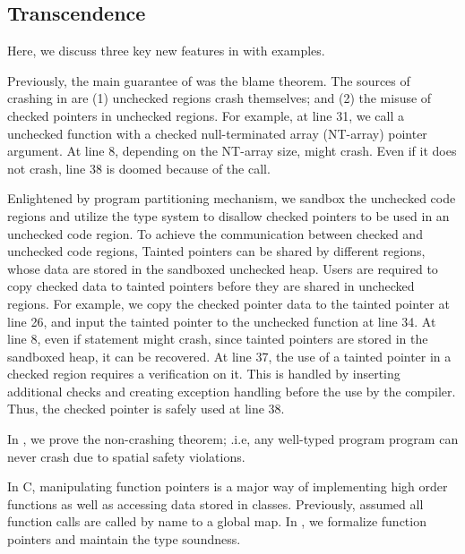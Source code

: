 \subsection{\systemname Transcendence}

Here, we discuss three key new features in \systemname with examples.

Previously, the main guarantee of \checkedc \cite{li22checkedc} was the blame theorem.
The sources of crashing in \checkedc are (1) unchecked regions crash themselves;
  and (2) the misuse of checked pointers in unchecked regions.
For example, at  line 31,
we call a unchecked function  with a checked null-terminated array (NT-array) pointer argument.
At line 8, depending on the NT-array size,  might crash.
Even if it does not crash, line 38 is doomed because of the  call.

Enlightened by program partitioning mechanism,
we sandbox the unchecked code regions and utilize the \checkedc type system
to disallow checked pointers to be used in an unchecked code region. 
To achieve the communication between checked and unchecked code regions,
Tainted pointers can be shared by different regions,
whose data are stored in the sandboxed unchecked heap.
Users are required to copy checked data to tainted pointers before they are shared in unchecked regions.
For example,  we copy the checked pointer data to the tainted pointer 
at  line 26,
and input the tainted pointer to the unchecked function at line 34.
At line 8, even if statement might crash, since tainted pointers are stored
in the sandboxed heap, it can be recovered.
At line 37, the use of a tainted pointer in a checked region
requires a verification on it.
This is handled by inserting additional checks
and creating exception handling before the use by the \systemname compiler.
Thus, the checked pointer  is safely used at line 38.

In \systemname, we prove the non-crashing theorem;
.i.e, any well-typed \systemname program program can never crash due to spatial safety violations.

In C, manipulating function pointers is a major way of 
implementing high order functions as well as accessing data stored in classes.
Previously, \checkedc assumed all function calls are called by name to a global map.
In \systemname, we formalize function pointers and maintain the \systemname type soundness.

